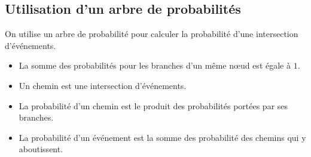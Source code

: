 \documentclass[12pt,a4paper]{article}
\begin{document}
\subsection{Utilisation d'un arbre de probabilités}	
	
\begin{mymeth}
	On utilise un arbre de probabilité pour calculer la probabilité d'une intersection d'événements.\\
	\begin{itemize}
		\item La somme des probabilités pour les branches d'un même n\oe ud est égale à $1$.
		\item Un chemin est une intersection d'événements.
		\item La probabilité d'un chemin est le produit des probabilités portées par ses branches.
		\item La probabilité d'un événement est la somme des probabilité des chemins qui y aboutissent.
	\end{itemize}

	
\end{mymeth}
	

\end{document}

